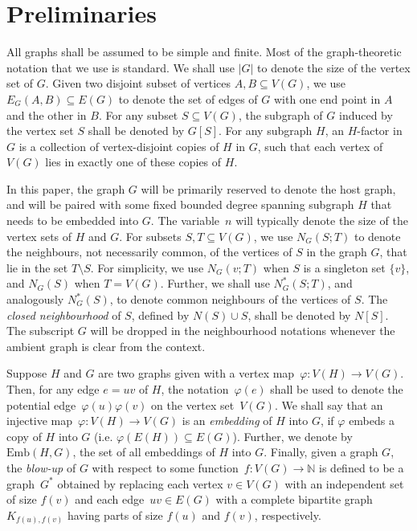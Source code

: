 \documentclass[final]{article}
\theoremstyle{definition}
\newcommand{\Emb}{\mathrm{Emb}}
\begin{document}
\section{Preliminaries}
\label{sec:prelims}
All graphs shall be assumed to be simple and finite. Most of the graph-theoretic notation that we use is standard. We shall use $|G|$ to denote the size of the vertex set of $G$. Given two disjoint subset of vertices $A, B \subseteq V(G)$, we use $E_G(A,B) \subseteq E(G)$ to denote the set of edges of $G$ with one end point in $A$ and the other in $B$. For any subset $S \subseteq V(G)$, the subgraph of $G$ induced by the vertex set $S$ shall be denoted by $G[S]$. For any subgraph $H$, an $H$-factor in $G$ is a collection of vertex-disjoint copies of $H$ in $G$, such that each vertex of $V(G)$ lies in exactly one of these copies of $H$. 

In this paper, the graph $G$ will be primarily reserved to denote the host graph, and will be paired with some fixed bounded degree spanning subgraph $H$ that needs to be embedded into $G$. The variable~$n$ will typically denote the size of the vertex sets of $H$ and $G$. For subsets $S, T \subseteq V(G)$, we use $N_G(S; T)$ to denote the neighbours, not necessarily common, of the vertices of $S$ in the graph $G$, that lie in the set $T\setminus S$. For simplicity, we use $N_G(v; T)$ when $S$ is a singleton set $\{v\}$, and $N_G(S)$ when $T = V(G)$. Further, we shall use $N^*_G(S; T)$, and analogously $N^*_G(S)$, to denote common neighbours of the vertices of $S$. The \emph{closed neighbourhood} of $S$, defined by $N(S) \cup S$, shall be denoted by $N[S]$. The subscript $G$ will be dropped in the neighbourhood notations whenever the ambient graph is clear from the context.  

Suppose $H$ and $G$ are two graphs given with a vertex map~$\varphi: V(H) \to V(G)$. Then, for any edge $e = uv$ of $H$, the notation~$\varphi(e)$ shall be used to denote the potential edge~$\varphi(u)\varphi(v)$ on the vertex set~$V(G)$. We shall say that an injective map~$\varphi: V(H) \rightarrow V(G)$ is an \emph{embedding} of $H$ into $G$, if $\varphi$ embeds a copy of $H$ into $G$ (i.e. $\varphi(E(H)) \subseteq E(G)$). Further, we denote by $\Emb(H,G)$, the set of all embeddings of $H$ into $G$. Finally, given a graph $G$, the \emph{blow-up} of $G$ with respect to some function~${f: V(G) \to \mathbb{N}}$ is defined to be a graph~$G^*$ obtained by replacing each vertex $v \in V(G)$ with an independent set of size $f(v)$ and each edge~$uv \in E(G)$ with a complete bipartite graph~$K_{f(u), f(v)}$ having parts of size $f(u)$ and $f(v)$, respectively.
\end{document}
